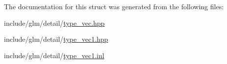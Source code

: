 The documentation for this struct was generated from the following files\+:\begin{DoxyCompactItemize}
\item 
include/glm/detail/\hyperlink{type__vec_8hpp}{type\+\_\+vec.\+hpp}\item 
include/glm/detail/\hyperlink{type__vec1_8hpp}{type\+\_\+vec1.\+hpp}\item 
include/glm/detail/\hyperlink{type__vec1_8inl}{type\+\_\+vec1.\+inl}\end{DoxyCompactItemize}
